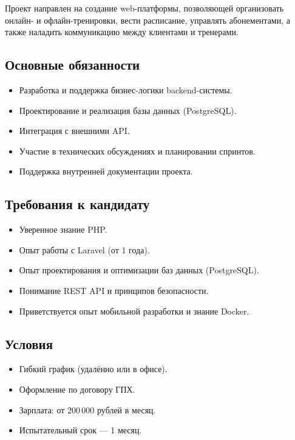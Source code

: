 \documentclass[14pt, russian]{matmex-diploma-custom}
\begin{document}
Проект направлен на создание web-платформы, позволяющей организовать онлайн- и офлайн-тренировки, вести расписание, управлять абонементами, а также наладить коммуникацию между клиентами и тренерами.

\subsection*{Основные обязанности}

\begin{itemize}[leftmargin=1.5em]
    \item Разработка и поддержка бизнес-логики backend-системы.
    \item Проектирование и реализация базы данных (PostgreSQL).
    \item Интеграция с внешними API.
    \item Участие в технических обсуждениях и планировании спринтов.
    \item Поддержка внутренней документации проекта.
\end{itemize}

\subsection*{Требования к кандидату}

\begin{itemize}[leftmargin=1.5em]
    \item Уверенное знание PHP.
    \item Опыт работы с Laravel (от 1 года).
    \item Опыт проектирования и оптимизации баз данных (PostgreSQL).
    \item Понимание REST API и принципов безопасности.
    \item Приветствуется опыт мобильной разработки и знание Docker.
\end{itemize}

\subsection*{Условия}
\begin{itemize}[leftmargin=1.5em]
    \item Гибкий график (удалённо или в офисе).
    \item Оформление по договору ГПХ.
    \item Зарплата: от 200\,000 рублей в месяц.
    \item Испытательный срок — 1 месяц.
\end{itemize}
\end{document}
